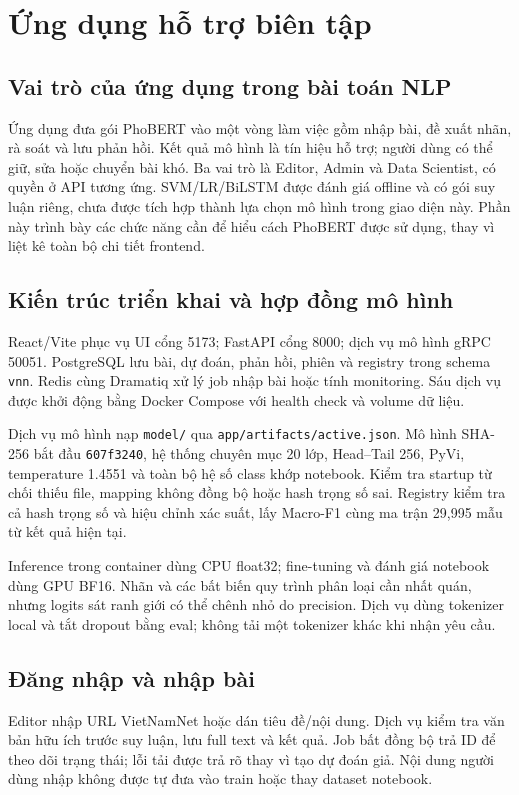 \chapter{Ứng dụng hỗ trợ biên tập}
\label{chap:application}
\section{Vai trò của ứng dụng trong bài toán NLP}
Ứng dụng đưa gói PhoBERT vào một vòng làm việc gồm nhập bài, đề xuất nhãn, rà soát và lưu phản hồi. Kết quả mô hình là tín hiệu hỗ trợ; người dùng có thể giữ, sửa hoặc chuyển bài khó. Ba vai trò là Editor, Admin và Data Scientist, có quyền ở API tương ứng. SVM/LR/BiLSTM được đánh giá offline và có gói suy luận riêng, chưa được tích hợp thành lựa chọn mô hình trong giao diện này. Phần này trình bày các chức năng cần để hiểu cách PhoBERT được sử dụng, thay vì liệt kê toàn bộ chi tiết frontend.

\section{Kiến trúc triển khai và hợp đồng mô hình}
\AppDiagram
React/Vite phục vụ UI cổng 5173; FastAPI cổng 8000; dịch vụ mô hình gRPC 50051. PostgreSQL lưu bài, dự đoán, phản hồi, phiên và registry trong schema \texttt{vnn}. Redis cùng Dramatiq xử lý job nhập bài hoặc tính monitoring. Sáu dịch vụ được khởi động bằng Docker Compose với health check và volume dữ liệu.

Dịch vụ mô hình nạp \texttt{model/} qua \texttt{app/artifacts/active.json}. Mô hình SHA-256 bắt đầu \texttt{607f3240}, hệ thống chuyên mục 20 lớp, Head--Tail 256, PyVi, temperature 1.4551 và toàn bộ hệ số class khớp notebook. Kiểm tra startup từ chối thiếu file, mapping không đồng bộ hoặc hash trọng số sai. Registry kiểm tra cả hash trọng số và hiệu chỉnh xác suất, lấy Macro-F1 cùng ma trận 29,995 mẫu từ kết quả hiện tại.

Inference trong container dùng CPU float32; fine-tuning và đánh giá notebook dùng GPU BF16. Nhãn và các bất biến quy trình phân loại cần nhất quán, nhưng logits sát ranh giới có thể chênh nhỏ do precision. Dịch vụ dùng tokenizer local và tắt dropout bằng eval; không tải một tokenizer khác khi nhận yêu cầu.

\section{Đăng nhập và nhập bài}
Editor nhập URL VietNamNet hoặc dán tiêu đề/nội dung. Dịch vụ kiểm tra văn bản hữu ích trước suy luận, lưu full text và kết quả. Job bất đồng bộ trả ID để theo dõi trạng thái; lỗi tải được trả rõ thay vì tạo dự đoán giả. Nội dung người dùng nhập không được tự đưa vào train hoặc thay dataset notebook.

